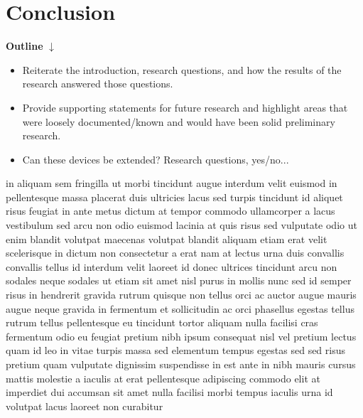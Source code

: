 \section*{Conclusion}

\textbf{Outline}
$\downarrow$

\begin{itemize}
    \item Reiterate the introduction, research questions, and how the results of the research answered those questions.
    \item Provide supporting statements for future research and highlight areas that were loosely documented/known and would have been solid preliminary research.
    \item Can these devices be extended? Research questions, yes/no...
\end{itemize}

in aliquam sem fringilla ut morbi tincidunt augue interdum velit euismod in pellentesque massa placerat duis ultricies lacus sed turpis tincidunt id aliquet risus feugiat in ante metus dictum at tempor commodo ullamcorper a lacus vestibulum sed arcu non odio euismod lacinia at quis risus sed vulputate odio ut enim blandit volutpat maecenas volutpat blandit aliquam etiam erat velit scelerisque in dictum non consectetur a erat nam at lectus urna duis convallis convallis tellus id interdum velit laoreet id donec ultrices tincidunt arcu non sodales neque sodales ut etiam sit amet nisl purus in mollis nunc sed id semper risus in hendrerit gravida rutrum quisque non tellus orci ac auctor augue mauris augue neque gravida in fermentum et sollicitudin ac orci phasellus egestas tellus rutrum tellus pellentesque eu tincidunt tortor aliquam nulla facilisi cras fermentum odio eu feugiat pretium nibh ipsum consequat nisl vel pretium lectus quam id leo in vitae turpis massa sed elementum tempus egestas sed sed risus pretium quam vulputate dignissim suspendisse in est ante in nibh mauris cursus mattis molestie a iaculis at erat pellentesque adipiscing commodo elit at imperdiet dui accumsan sit amet nulla facilisi morbi tempus iaculis urna id volutpat lacus laoreet non curabitur
